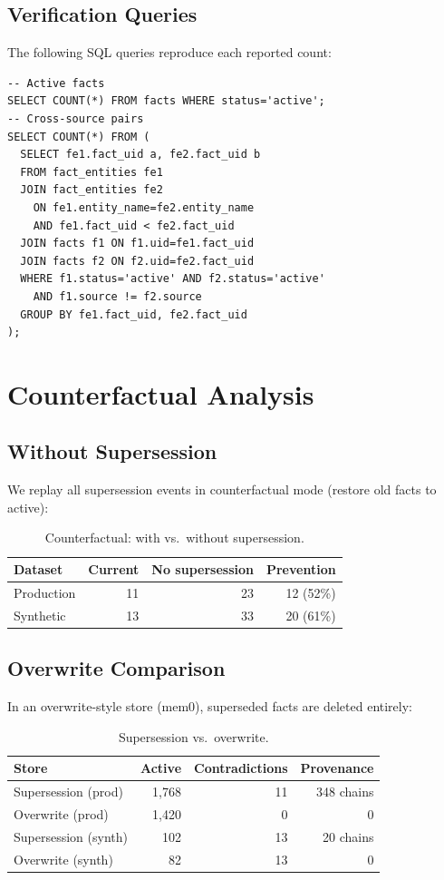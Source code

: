 \documentclass{article}
\begin{document}
\subsection{Verification Queries}
The following SQL queries reproduce each reported count:
\begin{verbatim}
-- Active facts
SELECT COUNT(*) FROM facts WHERE status='active';
-- Cross-source pairs
SELECT COUNT(*) FROM (
  SELECT fe1.fact_uid a, fe2.fact_uid b
  FROM fact_entities fe1
  JOIN fact_entities fe2
    ON fe1.entity_name=fe2.entity_name
    AND fe1.fact_uid < fe2.fact_uid
  JOIN facts f1 ON f1.uid=fe1.fact_uid
  JOIN facts f2 ON f2.uid=fe2.fact_uid
  WHERE f1.status='active' AND f2.status='active'
    AND f1.source != f2.source
  GROUP BY fe1.fact_uid, fe2.fact_uid
);
\end{verbatim}


\section{Counterfactual Analysis}
\label{sec:counterfactual}

\subsection{Without Supersession}
We replay all supersession events in counterfactual mode (restore old facts to active):

\begin{table}[h]
\centering
\caption{Counterfactual: with vs.\ without supersession.}
\begin{tabular}{lrrr}
\toprule
Dataset & Current & No supersession & Prevention \\
\midrule
Production & 11 & 23 & 12 (52\%) \\
Synthetic & 13 & 33 & 20 (61\%) \\
\bottomrule
\end{tabular}
\label{tab:cf}
\end{table}

\subsection{Overwrite Comparison}
In an overwrite-style store (mem0), superseded facts are deleted entirely:

\begin{table}[h]
\centering
\caption{Supersession vs.\ overwrite.}
\begin{tabular}{lrrr}
\toprule
Store & Active & Contradictions & Provenance \\
\midrule
Supersession (prod) & 1{,}768 & 11 & 348 chains \\
Overwrite (prod) & 1{,}420 & 0 & 0 \\
Supersession (synth) & 102 & 13 & 20 chains \\
Overwrite (synth) & 82 & 13 & 0 \\
\bottomrule
\end{tabular}
\label{tab:overwrite}
\end{table}
\end{document}
